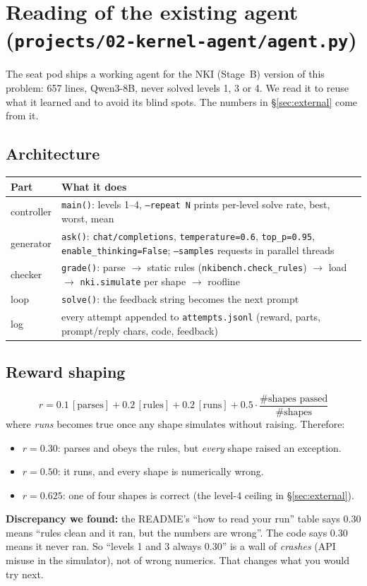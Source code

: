 \documentclass[11pt]{article}
\newcommand{\code}[1]{\texttt{#1}}
\begin{document}
\section{Reading of the existing agent (\code{projects/02-kernel-agent/agent.py})}
\label{sec:existing}

The seat pod ships a working agent for the NKI (Stage~B) version of this problem: 657 lines,
Qwen3-8B, never solved levels 1, 3 or 4. We read it to reuse what it learned and to avoid its
blind spots. The numbers in \S\ref{sec:external} come from it.

\subsection{Architecture}

\begin{tabularx}{\linewidth}{@{}lY@{}}
\toprule
Part & What it does \\
\midrule
controller & \code{main()}: levels 1--4, \code{--repeat N} prints per-level solve rate, best,
  worst, mean \\
generator & \code{ask()}: \code{chat/completions}, \code{temperature=0.6}, \code{top\_p=0.95},
  \code{enable\_thinking=False}; \code{--samples} requests in parallel threads \\
checker & \code{grade()}: parse $\to$ static rules (\code{nkibench.check\_rules}) $\to$ load
  $\to$ \code{nki.simulate} per shape $\to$ roofline \\
loop & \code{solve()}: the feedback string becomes the next prompt \\
log & every attempt appended to \code{attempts.jsonl} (reward, parts, prompt/reply chars, code,
  feedback) \\
\bottomrule
\end{tabularx}

\subsection{Reward shaping}

\[
  r = 0.1\,[\text{parses}] + 0.2\,[\text{rules}] + 0.2\,[\text{runs}]
      + 0.5\cdot\frac{\#\text{shapes passed}}{\#\text{shapes}}
\]
where \emph{runs} becomes true once any shape simulates without raising. Therefore:
\begin{itemize}
  \item $r=0.30$: parses and obeys the rules, but \emph{every} shape raised an exception.
  \item $r=0.50$: it runs, and every shape is numerically wrong.
  \item $r=0.625$: one of four shapes is correct (the level-4 ceiling in \S\ref{sec:external}).
\end{itemize}
\textbf{Discrepancy we found:} the README's ``how to read your run'' table says 0.30 means ``rules
clean and it ran, but the numbers are wrong''. The code says 0.30 means it never ran. So
``levels 1 and 3 always 0.30'' is a wall of \emph{crashes} (API misuse in the simulator), not of
wrong numerics. That changes what you would try next.
\end{document}
